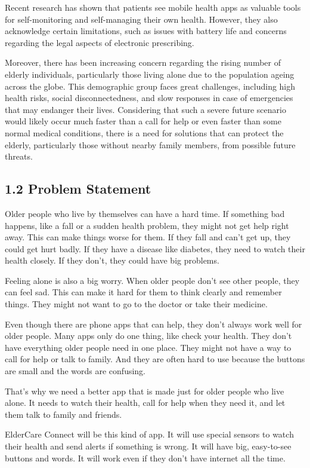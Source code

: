 \documentclass{article}
\begin{document}
Recent research has shown that patients see mobile health apps as valuable tools for self-monitoring and self-managing their own health. However, they also acknowledge certain limitations, such as issues with battery life and concerns regarding the legal aspects of electronic prescribing.

Moreover, there has been increasing concern regarding the rising number of elderly individuals, particularly those living alone due to the population ageing across the globe. This demographic group faces great challenges, including high health risks, social disconnectedness, and slow responses in case of emergencies that may endanger their lives. Considering that such a severe future scenario would likely occur much faster than a call for help or even faster than some normal medical conditions, there is a need for solutions that can protect the elderly, particularly those without nearby family members, from possible future threats.

\subsection*{1.2 Problem Statement}

Older people who live by themselves can have a hard time. If something bad happens, like a fall or a sudden health problem, they might not get help right away. This can make things worse for them. If they fall and can't get up, they could get hurt badly. If they have a disease like diabetes, they need to watch their health closely. If they don't, they could have big problems.

Feeling alone is also a big worry. When older people don't see other people, they can feel sad. This can make it hard for them to think clearly and remember things. They might not want to go to the doctor or take their medicine.

Even though there are phone apps that can help, they don't always work well for older people. Many apps only do one thing, like check your health. They don't have everything older people need in one place. They might not have a way to call for help or talk to family. And they are often hard to use because the buttons are small and the words are confusing.

That's why we need a better app that is made just for older people who live alone. It needs to watch their health, call for help when they need it, and let them talk to family and friends.

ElderCare Connect will be this kind of app. It will use special sensors to watch their health and send alerts if something is wrong. It will have big, easy-to-see buttons and words. It will work even if they don't have internet all the time.
\end{document}
